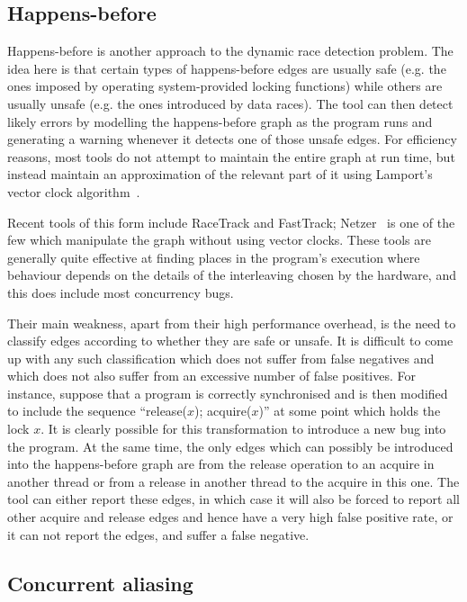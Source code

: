 \subsection{Happens-before}

Happens-before is another approach to the dynamic race detection
problem.  The idea here is that certain types of happens-before edges
are usually safe (e.g. the ones imposed by operating system-provided
locking functions) while others are usually unsafe (e.g. the ones
introduced by data races).  The tool can then detect likely errors by
modelling the happens-before graph as the program runs and generating
a warning whenever it detects one of those unsafe edges.  For
efficiency reasons, most tools do not attempt to maintain the entire
graph at run time, but instead maintain an approximation of the
relevant part of it using Lamport's vector clock
algorithm~\cite{Lamport1978}.

Recent tools of this form include RaceTrack\cite{Yu2005} and
FastTrack\cite{Flanagan2009}; Netzer~\cite{Netzer1991} is one of the
few which manipulate the graph without using vector clocks.  These
tools are generally quite effective at finding places in the program's
execution where behaviour depends on the details of the interleaving
chosen by the hardware, and this does include most concurrency bugs.

Their main weakness, apart from their high performance overhead, is
the need to classify edges according to whether they are safe or
unsafe.  It is difficult to come up with any such classification which
does not suffer from false negatives and which does not also suffer
from an excessive number of false positives.  For instance, suppose
that a program is correctly synchronised and is then modified to include the sequence
``release($x$); acquire($x$)'' at some point which holds the lock $x$.
It is clearly possible for this transformation to introduce a new bug
into the program.  At the same time, the only edges which can possibly
be introduced into the happens-before graph are from the release
operation to an acquire in another thread or from a release in another
thread to the acquire in this one.  The tool can either report these
edges, in which case it will also be forced to report all other
acquire and release edges and hence have a very high false positive
rate, or it can not report the edges, and suffer a false negative.

\subsection{Concurrent aliasing}

